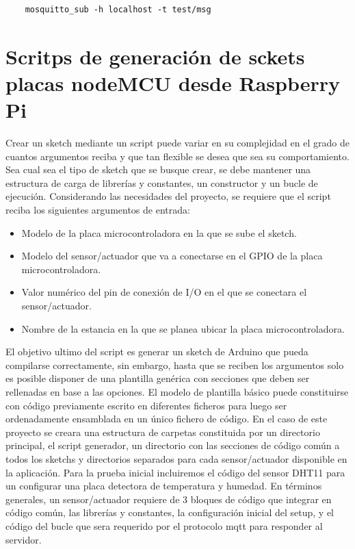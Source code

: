 \begin{verbatim}
    mosquitto_sub -h localhost -t test/msg
\end{verbatim}

\section{Scritps de generación de sckets placas nodeMCU desde Raspberry Pi}
\label{AppendiA:Key5}

Crear un sketch mediante un script puede variar en su complejidad en el grado de cuantos argumentos reciba y que tan flexible se desea que sea su comportamiento. Sea cual sea el tipo de sketch que se busque crear, se debe mantener una estructura de carga de librerías y constantes, un constructor y un bucle de ejecución. Considerando las necesidades del proyecto, se requiere que el script reciba los siguientes argumentos de entrada:

\begin{itemize}
  \item Modelo de la placa microcontroladora en la que se sube el sketch.

  \item Modelo del sensor/actuador que va a conectarse en el GPIO de la placa microcontroladora.

  \item Valor numérico del pin de conexión de I/O en el que se conectara el sensor/actuador.
  
  \item Nombre de la estancia en la que se planea ubicar la placa microcontroladora.
\end{itemize}

El objetivo ultimo del \gls{script} es generar un \gls{sketch} de Arduino que pueda compilarse correctamente, sin embargo, hasta que se reciben los argumentos solo es posible disponer de una plantilla genérica con secciones que deben ser rellenadas en base a las opciones. El modelo de plantilla básico puede constituirse con código previamente escrito en diferentes ficheros para luego ser ordenadamente ensamblada en un único fichero de código. En el caso de este proyecto se creara una estructura de carpetas constituida por un directorio principal, el script generador, un directorio con las secciones de código común a todos los sketchs y directorios separados para cada sensor/actuador disponible en la aplicación. Para la prueba inicial incluiremos el código del sensor DHT11 para un configurar una placa detectora de temperatura y humedad. En términos generales, un sensor/actuador requiere de 3 bloques de código que integrar en código común, las librerías y constantes, la configuración inicial del setup, y el código del bucle que sera requerido por el protocolo \gls{mqtt} para responder al servidor.


